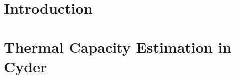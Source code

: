 \section{Introduction}

\section{Thermal Capacity Estimation in Cyder}\label{sec:thermal_capacity}



%
